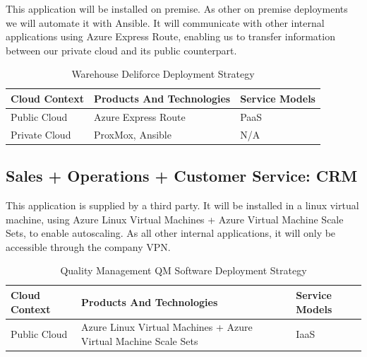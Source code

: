\documentclass{llncs}
\begin{document}
This application will be installed on premise. As other on premise deployments we will automate it with Ansible.
It will communicate with other internal applications using Azure Express Route, enabling us to transfer information between our private cloud and its public counterpart.\\

\begin{table}[h!]
    \centering
    \begin{tabular}{lll}
        \hline
        \textbf{Cloud Context} & \textbf{Products And Technologies} & \textbf{Service Models} \\
        \hline
        Public Cloud           & Azure Express Route                & PaaS                    \\
        \hline
        Private Cloud          & ProxMox, Ansible                   & N/A                     \\
        \hline
    \end{tabular}
    \caption{Warehouse Deliforce Deployment Strategy}
\end{table}

\subsection{Sales + Operations + Customer Service: CRM}

This application is supplied by a third party. It will be installed in a linux virtual machine, using Azure Linux Virtual Machines + Azure Virtual Machine Scale Sets, to enable autoscaling.
As all other internal applications, it will only be accessible through the company VPN.\\

\begin{table}[h!]
    \centering
    \begin{tabular}{lll}
        \hline
        \textbf{Cloud Context} & \textbf{Products And Technologies}                              & \textbf{Service Models} \\
        \hline
        Public Cloud           & Azure Linux Virtual Machines + Azure Virtual Machine Scale Sets & IaaS                    \\
    \end{tabular}
    \caption{Quality Management QM Software Deployment Strategy}
\end{table}
\end{document}
